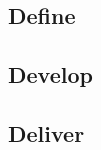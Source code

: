 \begin{newpage}

    \subsection{Define}
    \label{sub:define}
      

    \subsection{Develop}
    \label{sub:develop}
      

    \subsection{Deliver}
    \label{sub:deliver}
      

    
\end{newpage}